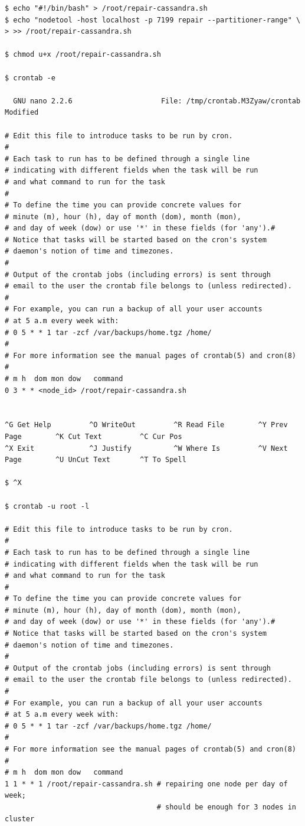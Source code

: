 \documentclass{article} %
\begin{document}
\begin{lstlisting}[style=bash, caption={konfiguracja okresowego naprawiania klastra}]
$ echo "#!/bin/bash" > /root/repair-cassandra.sh
$ echo "nodetool -host localhost -p 7199 repair --partitioner-range" \ 
> >> /root/repair-cassandra.sh

$ chmod u+x /root/repair-cassandra.sh

$ crontab -e

  GNU nano 2.2.6                     File: /tmp/crontab.M3Zyaw/crontab                                        Modified

# Edit this file to introduce tasks to be run by cron.
#
# Each task to run has to be defined through a single line
# indicating with different fields when the task will be run
# and what command to run for the task
#
# To define the time you can provide concrete values for
# minute (m), hour (h), day of month (dom), month (mon),
# and day of week (dow) or use '*' in these fields (for 'any').#
# Notice that tasks will be started based on the cron's system
# daemon's notion of time and timezones.
#
# Output of the crontab jobs (including errors) is sent through
# email to the user the crontab file belongs to (unless redirected).
#
# For example, you can run a backup of all your user accounts
# at 5 a.m every week with:
# 0 5 * * 1 tar -zcf /var/backups/home.tgz /home/
#
# For more information see the manual pages of crontab(5) and cron(8)
#
# m h  dom mon dow   command
0 3 * * <node_id> /root/repair-cassandra.sh


^G Get Help         ^O WriteOut         ^R Read File        ^Y Prev Page        ^K Cut Text         ^C Cur Pos
^X Exit             ^J Justify          ^W Where Is         ^V Next Page        ^U UnCut Text       ^T To Spell

$ ^X

$ crontab -u root -l

# Edit this file to introduce tasks to be run by cron.
#
# Each task to run has to be defined through a single line
# indicating with different fields when the task will be run
# and what command to run for the task
#
# To define the time you can provide concrete values for
# minute (m), hour (h), day of month (dom), month (mon),
# and day of week (dow) or use '*' in these fields (for 'any').#
# Notice that tasks will be started based on the cron's system
# daemon's notion of time and timezones.
#
# Output of the crontab jobs (including errors) is sent through
# email to the user the crontab file belongs to (unless redirected).
#
# For example, you can run a backup of all your user accounts
# at 5 a.m every week with:
# 0 5 * * 1 tar -zcf /var/backups/home.tgz /home/
#
# For more information see the manual pages of crontab(5) and cron(8)
#
# m h  dom mon dow   command
1 1 * * 1 /root/repair-cassandra.sh # repairing one node per day of week;
                                    # should be enough for 3 nodes in cluster

\end{lstlisting}
\end{document}
